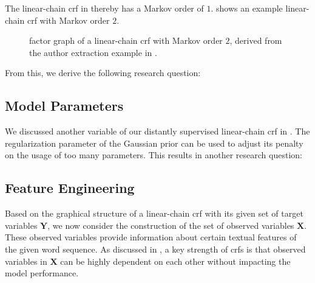 The \gls{linear-chain crf} in  thereby has a Markov order of $1$.
 shows an example \gls{linear-chain crf} with Markov order $2$.
\begin{figure}[t]
\centering

\caption{%
  \Gls{factor graph} of a \gls{linear-chain crf} with Markov order $2$, derived from the author extraction example in .}
\label{fig:example-linear-chain-crf-markov-order-2}
\end{figure}

From this, we derive the following research question:
\newcommand\researchquestionseven{}
\researchquestionseven%


\subsection{Model Parameters}\label{subsec:ae-model-parameters}

We discussed another variable of our distantly supervised \gls{linear-chain crf} in .
The regularization parameter of the Gaussian prior can be used to adjust its penalty on the usage of too many parameters.
This results in another research question:
\newcommand\researchquestioneight{}
\researchquestioneight%

\subsection{Feature Engineering}\label{subsec:ae-feature-engineering}

Based on the graphical structure of a \gls{linear-chain crf} with its given set of \glspl{target variable} $\mathbf{Y}$, we now consider the construction of the set of \glspl{observed variable} $\mathbf{X}$.
These \glspl{observed variable} provide information about certain textual features of the given word sequence.
As discussed in , a key strength of \glspl{crf} is that \glspl{observed variable} in $\mathbf{X}$ can be highly dependent on each other without impacting the model performance.

